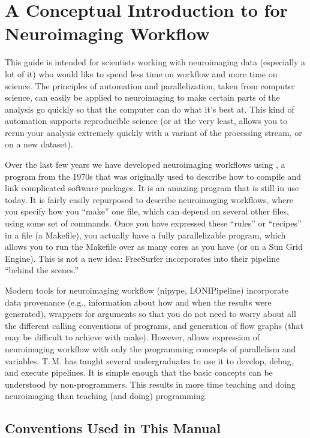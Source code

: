 \chapter[Introduction to \maken{}]{A Conceptual Introduction to \maken{} for Neuroimaging Workflow}
\label{chap:intro}
	
This guide is intended for scientists working with neuroimaging data (especially a lot of it) who would like to spend less time on workflow and more time on science. The principles of automation and parallelization, taken from computer science, can easily be applied to neuroimaging to make certain parts of the analysis go quickly so that the computer can do what it's best at. This kind of automation supports reproducible science (or at the very least, allows you to rerun your analysis extremely quickly with a variant of the processing stream, or on a new dataset).
	
Over the last few years we have developed neuroimaging workflows using \maken, a program from the 1970s that was originally used to describe how to compile and link complicated software packages. It is an amazing program that is still in use today. It is fairly easily repurposed to describe neuroimaging workflows, where you specify how you ``make'' one file, which can depend on several other files, using some set of commands. Once you have expressed these ``rules'' or ``recipes'' in a file (a Makefile), you actually have a fully parallelizable program, which allows you to run the Makefile over as many cores as you have (or on a Sun Grid Engine). This is not a new idea: FreeSurfer incorporates \maken{} into their pipeline ``behind the scenes.''
	
Modern tools for neuroimaging workflow (nipype, LONIPipeline) incorporate data provenance (e.g., information about how and when the results were generated), wrappers for arguments so that you do not need to worry about all the different calling conventions of programs, and generation of flow graphs (that may be difficult to achieve with make). However, \maken{} allows expression of neuroimaging workflow with only the programming concepts of parallelism and variables. T.\,M. has taught several undergraduates to use it to develop, debug, and execute pipelines. It is simple enough that the basic concepts can be understood by non-programmers. This results in more time teaching and doing neuroimaging than teaching (and doing) programming.
	
\section{Conventions Used in This Manual}
	

